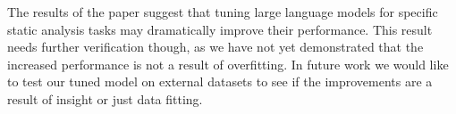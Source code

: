 \documentclass[acmsmall]{acmart}
\providecommand\BibTeX{{%
    Bib\TeX}}}
\begin{document}
The results of the paper suggest that tuning large language models for specific static analysis tasks may dramatically improve their performance. This result needs further verification though, as we have not yet demonstrated that the increased performance is not a result of overfitting. In future work we would like to test our tuned model on external datasets to see if the improvements are a result of insight or just data fitting. 







\end{document}
